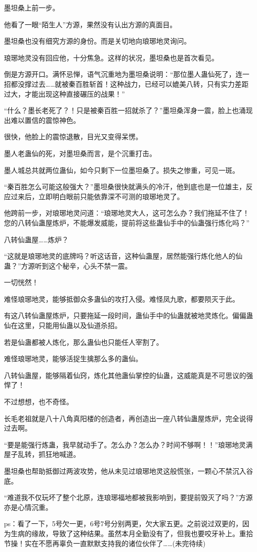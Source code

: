 \begin{this_body}
墨坦桑上前一步。

他看了一眼“陌生人”方源，果然没有认出方源的真面目。

墨坦桑也没有细究方源的身份。而是关切地向琅琊地灵询问。

琅琊地灵没有回应他，十分焦急。这样的状况，墨坦桑也是首次看见。

倒是方源开口。满怀忌惮，语气沉重地为墨坦桑说明：“那位墨人蛊仙死了，连一招都没撑过去……就被秦百胜斩首！这种战力，已经可以媲美八转，只有实力差距过大，才能出现这种直接碾压的战果！”

“什么？墨长老死了？！只是被秦百胜一招就杀了？”墨坦桑浑身一震，脸上也涌现出难以置信的震惊神色。

很快，他脸上的震惊退散，目光又变得呆愣。

墨人老蛊仙的死，对墨坦桑而言，是个沉重打击。

墨人城总共就两位蛊仙，如今只剩下一位墨坦桑了。损失之惨重，可见一斑。

“秦百胜怎么可能这般强大？”墨坦桑很快就满头的冷汗，他到底也是一位雄主，反应过来后，立即明白眼前只能依靠深不可测的琅琊地灵了。

他跨前一步，对琅琊地灵问道：“琅琊地灵大人，这可怎么办？我们拖延不住了！您的八转仙蛊屋炼炉，不能爆发威能，提前将这些蛊仙手中的仙蛊强行炼化吗？”

八转仙蛊屋……炼炉？

“这就是琅琊地灵的底牌吗？听这话音，这种仙蛊屋，居然能强行炼化他人的仙蛊？”方源听到这个秘辛，心头不禁一震。

一切恍然！

难怪琅琊地灵，能够抵御众多蛊仙的攻打入侵。难怪凤九歌，都要陨灭于此。

有这八转仙蛊屋炼炉，只要拖延一段时间，蛊仙手中的仙蛊就被地灵炼化。偏偏蛊仙在这里，只能用仙蛊以及仙道杀招。

若是仙蛊都被人炼化，那么蛊仙也只能任人宰割了。

难怪琅琊地灵，能够活捉生擒那么多的蛊仙。

八转仙蛊屋，能够隔着仙窍，炼化其他蛊仙掌控的仙蛊，这威能真是不可思议的强悍了！

不过想想，也不奇怪。

长毛老祖就是八十八角真阳楼的创造者，再创造出一座八转仙蛊屋炼炉，完全说得过去啊。

“要是能强行炼蛊，我早就动手了。怎么办？怎么办？时间不够啊！！”琅琊地灵满屋子乱转，抓狂地喊道。

墨坦桑也帮助抵御过两波攻势，他从未见过琅琊地灵这般慌张，一颗心不禁沉入谷底。

“难道我不仅玩坏了整个北原，连琅琊福地都被我影响到，要提前毁灭了吗？”方源亦是心情沉重。

ps：看了一下，5号欠一更，6号7号分别两更，欠大家五更。之前说过双更的，因为生病的缘故，导致了这种结果。虽然本月全勤没有了，但我也要咬牙补上。重拾节操！实在不愿再辜负一直默默支持我的诸位伙伴了……(未完待续)

\end{this_body}

